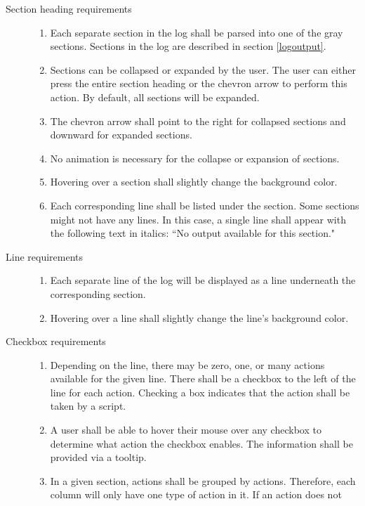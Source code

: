 \begin{description}
\item[Section heading requirements] \hfill
\begin{enumerate}
  \item Each separate section in the log shall be parsed into one of the gray
  sections. Sections in the log are described in section \ref{logoutput}.
  \item Sections can be collapsed or expanded by the user.  The user can either
  press the entire section heading or the chevron arrow to perform this action.
  By default, all sections will be expanded.
  \item The chevron arrow shall point to the right for collapsed sections and
  downward for expanded sections.
  \item No animation is necessary for the collapse or expansion of sections.
  \item Hovering over a section shall slightly change the background color.
  \item Each corresponding line shall be listed under the section.  Some
  sections might not have any lines.  In this case, a single line shall appear
  with the following text in italics: ``No output available for this section."
\end{enumerate}
\item[Line requirements] \hfill
\begin{enumerate}
  \item Each separate line of the log will be displayed as a line underneath the
  corresponding section.
  \item Hovering over a line shall slightly change the line's background color.
\end{enumerate}
\item[Checkbox requirements] \hfill
\begin{enumerate}
  \item Depending on the line, there may be zero, one, or many actions available
  for the given line.  There shall be a checkbox to the left of the line for
  each action.  Checking a box indicates that the action shall be taken by a
  script.
  \item A user shall be able to hover their mouse over any checkbox to
  determine what action the checkbox enables.  The information shall be provided
  via a tooltip. 
  \item In a given section, actions shall be grouped by actions.  Therefore,
  each column will only have one type of action in it.  If an action does not

\end{enumerate}
\end{description}
